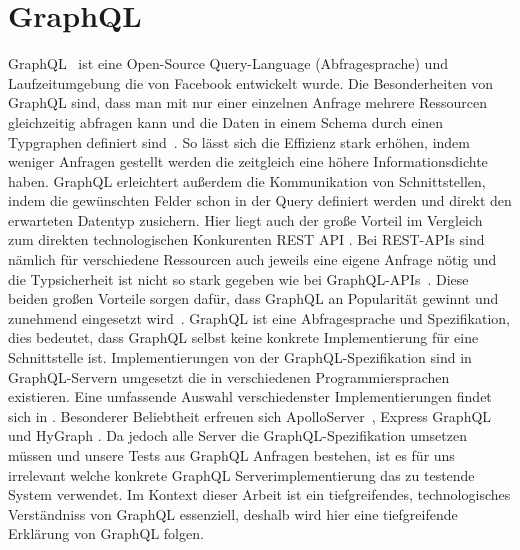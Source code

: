 \section{GraphQL}
\label{graphql}

GraphQL~\cite{graphqlspecification} ist eine Open-Source Query-Language (Abfragesprache) und Laufzeitumgebung die von Facebook entwickelt wurde\cite[vgl. Introduction]{graphqlspecification}.
Die Besonderheiten von GraphQL sind, dass man mit nur einer einzelnen Anfrage mehrere Ressourcen gleichzeitig abfragen kann \cite[vgl. No More Over- and Underfetching]{howtographql} und die
Daten in einem Schema durch einen Typgraphen definiert sind~\cite[vgl. Benefits of a Schema \& Type System]{howtographql}.
So lässt sich die Effizienz stark erhöhen, indem weniger Anfragen gestellt werden die zeitgleich eine höhere Informationsdichte haben.
GraphQL erleichtert außerdem die Kommunikation von Schnittstellen, indem die gewünschten Felder schon in der Query definiert werden
und direkt den erwarteten Datentyp zusichern.
Hier liegt auch der große Vorteil im Vergleich zum direkten technologischen Konkurenten REST API \cite[vgl. Welche REST-Einschränkungen versucht GraphQL zu überwinden?]{awsrestgraphql}.
Bei REST-APIs sind nämlich für verschiedene Ressourcen auch jeweils eine eigene Anfrage nötig \cite[vgl. No More Over- and Underfetching]{howtographql} und die Typsicherheit ist nicht so stark gegeben
wie bei GraphQL-APIs~\cite[vgl. Zusammenfassung der Unterschiede: REST vs. GraphQL]{awsrestgraphql}.
Diese beiden großen Vorteile sorgen dafür, dass GraphQL an Popularität gewinnt und zunehmend eingesetzt wird~\cite[vgl. Continued growth and the road ahead]{graphql-growing-report}.
GraphQL ist eine Abfragesprache und Spezifikation, dies bedeutet, dass GraphQL selbst keine konkrete Implementierung für
eine Schnittstelle ist.
Implementierungen von der GraphQL-Spezifikation sind in GraphQL-Servern umgesetzt die in verschiedenen Programmiersprachen existieren.
Eine umfassende Auswahl verschiedenster Implementierungen findet sich in \cite{gqlimplementation}.
Besonderer Beliebtheit erfreuen sich ApolloServer~\cite{apolloqgl}, Express GraphQL~\cite{expressgql} und HyGraph \cite{hygql}.
Da jedoch alle Server die GraphQL-Spezifikation umsetzen müssen und unsere Tests aus GraphQL Anfragen bestehen, ist es für uns
irrelevant welche konkrete GraphQL Serverimplementierung das zu testende System verwendet.
Im Kontext dieser Arbeit ist ein tiefgreifendes, technologisches Verständniss von GraphQL essenziell, deshalb wird hier
eine tiefgreifende Erklärung von GraphQL folgen.

